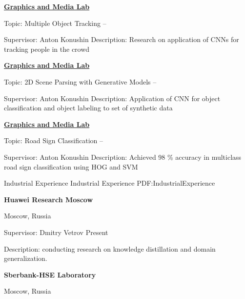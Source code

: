 \documentclass[letterpaper,MMMyyyy,nonstopmode]{simpleresumecv}
\begin{document}
\begin{Body}
\Entry
\href{https://graphics.cs.msu.ru}
{\textbf{Graphics and Media Lab}}

\Gap
\BulletItem
Topic: Multiple Object Tracking
\hfill
{} --
\begin{Detail}
\SubBulletItem
Supervisor:
Anton Konushin
\SubBulletItem
Description:
Research on application of CNNs for tracking people in the crowd
\end{Detail}

\Gap

\Entry
\href{https://graphics.cs.msu.ru}
{\textbf{Graphics and Media Lab}}

\Gap
\BulletItem
Topic: 2D Scene Parsing with Generative Models
\hfill
{} --
\begin{Detail}
\SubBulletItem
Supervisor:
Anton Konushin
\SubBulletItem
Description:
Application of CNN for object classification and object labeling to \newline
set of synthetic data
\end{Detail}

\Gap

\Entry
\href{https://graphics.cs.msu.ru}
{\textbf{Graphics and Media Lab}}

\Gap
\BulletItem
Topic: Road Sign Classification
\hfill
{} --
\begin{Detail}
\SubBulletItem
Supervisor:
Anton Konushin
\SubBulletItem
Description:
Achieved 98 \% accuracy in multiclass road sign classification \newline
using HOG and SVM
\end{Detail}



\Section
{Industrial Experience}
{Industrial Experience}
{PDF:IndustrialExperience}

\Entry
\textbf{Huawei Research Moscow}
\par
Moscow, Russia

\Gap
\BulletItem
Supervisor: Dmitry Vetrov
\hfill
Present
\begin{Detail}
\SubBulletItem
Description: conducting research on knowledge distillation and domain generalization.
\end{Detail}

\Gap

\Entry
\textbf{Sberbank-HSE Laboratory}
\par
Moscow, Russia


\end{Body}
\end{document}
